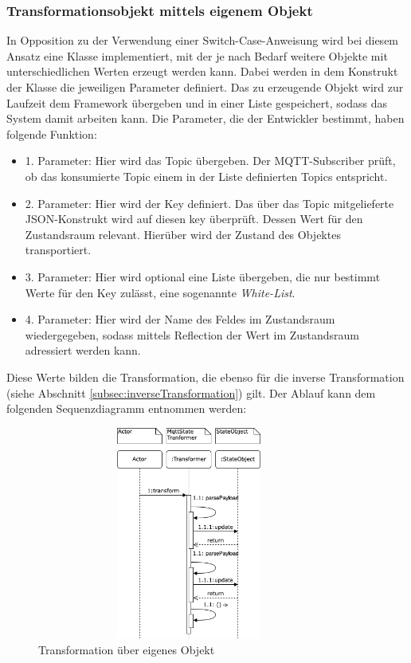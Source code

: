     \subsubsection*{Transformationsobjekt mittels eigenem Objekt}
        In Opposition zu der Verwendung einer Switch-Case-Anweisung wird bei diesem Ansatz eine Klasse implementiert, mit der je nach Bedarf 
        weitere Objekte mit unterschiedlichen Werten erzeugt werden kann. Dabei werden in dem Konstrukt der Klasse die jeweiligen Parameter 
        definiert. Das zu erzeugende Objekt wird zur Laufzeit dem Framework übergeben und in einer Liste gespeichert, sodass das System damit arbeiten kann. 
        Die Parameter, die der Entwickler bestimmt, haben folgende Funktion:
        \begin{itemize}
            \item 1. Parameter: Hier wird das Topic übergeben. Der \acs{MQTT}-Subscriber prüft, ob das konsumierte Topic einem in der Liste definierten Topics entspricht.
            \item 2. Parameter: Hier wird der Key definiert. Das über das Topic mitgelieferte JSON-Konstrukt wird auf diesen key überprüft. Dessen Wert für den Zustandsraum relevant. Hierüber wird der Zustand des Objektes transportiert.
            \item 3. Parameter: Hier wird optional eine Liste übergeben, die nur bestimmt Werte für den Key zulässt, eine sogenannte \textit{White-List}.
            \item 4. Parameter: Hier wird der Name des Feldes im Zustandsraum wiedergegeben, sodass mittels Reflection der Wert im Zustandsraum adressiert werden kann.
        \end{itemize}
        Diese Werte bilden die Transformation, die ebenso für die inverse Transformation (siehe Abschnitt \ref{subsec:inverseTransformation}) gilt.
        Der Ablauf kann dem folgenden Sequenzdiagramm entnommen werden:
    \begin{figure}[hbt!]
        \centering
        \includegraphics[width=10cm,height=7cm,keepaspectratio]{images/Transformation_new.drawio.png}
        \caption{Transformation über eigenes Objekt}
        \label{fig:sequenceTransformationNew}
    \end{figure}
